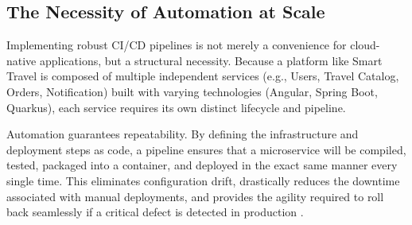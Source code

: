 \subsection{The Necessity of Automation at Scale}

Implementing robust CI/CD pipelines is not merely a convenience for cloud-native applications, but a structural necessity. Because a platform like Smart Travel is composed of multiple independent services (e.g., Users, Travel Catalog, Orders, Notification) built with varying technologies (Angular, Spring Boot, Quarkus), each service requires its own distinct lifecycle and pipeline. 

Automation guarantees repeatability. By defining the infrastructure and deployment steps as code, a pipeline ensures that a microservice will be compiled, tested, packaged into a container, and deployed in the exact same manner every single time. This eliminates configuration drift, drastically reduces the downtime associated with manual deployments, and provides the agility required to roll back seamlessly if a critical defect is detected in production \cite{redhat_cicd_explained}.